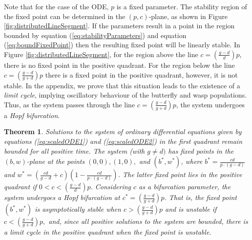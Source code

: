 \documentclass[review,authoryear]{elsarticle}
\newtheorem{theorem}{Theorem}[section]
\begin{document}
Note that for the case of the ODE, $p$ is a fixed parameter. The stability region of the fixed point can be
determined in the $(p,c)$-plane, as shown in Figure
\ref{fig:distributedLineSegment}. If the parameters result in a point in
the region bounded by equation (\ref{eq:stabilityParameters}) and
equation (\ref{eq:boundFixedPoint}) then the resulting
fixed point will be linearly stable. In Figure
\ref{fig:distributedLineSegment}, for the region above the line $c=\left( \frac{g-d}{d}\right)p$, there is no fixed point in the positive quadrant.  For the region below the line $c = \left( \frac{g-d}{g+d}\right)p$ there is a fixed point in the positive quadrant, however, it is not stable.  In the appendix, we prove that this situation leads to the existence of a {\it limit cycle}, implying oscillatory behaviour of the butterfly and wasp populations. Thus, as the system passes through the line $c = \left( \frac{g-d}{g+d}\right)p$, the system undergoes a {\it Hopf bifurcation}.   

\begin{theorem}  
\label{thm:hopfBifurcation}
Solutions to the  system of ordinary differential equations given by equations (\ref{eq:scaledODE1}) and (\ref{eq:scaledODE2}) in the first quadrant remain bounded for all positive time.  The system (with $g\ne d)$ has fixed points in the $(b,w)$-plane at the points $(0,0), (1,0),$ and $(b^*,w^*)$, where $b^*=\frac{cd}{p\cdot (g-d)}$ and
$w^*=\left(\frac{cd}{g-d}+c\right)\left(1-\frac{cd}{p\cdot (g-d)}\right)$.  The latter fixed point lies in the positive quadrant if $0<c<\left( \frac{g-d}{d}\right)p$. 
Considering $c$ as a bifurcation parameter, the system undergoes a Hopf bifurcation at $c^* = \left( \frac{g-d}{g+d}\right)p$.  
That is, the fixed point $(b^*,w^*)$ is asymptotically stable when $c>\left( \frac{g-d}{g+d}\right)p$ and is unstable if $c<\left( \frac{g-d}{g+d}\right)p,$ and, since all positive solutions to the system are bounded,  there is  a  limit cycle in the positive quadrant when the fixed point is unstable.
\end{theorem}
\end{document}
